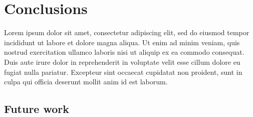 

\chapter{Conclusions} \label{cha:concl}



\drop Lorem ipsum dolor sit amet, consectetur adipiscing elit, sed do eiusmod
tempor incididunt ut labore et dolore magna aliqua. Ut enim ad minim veniam,
quis nostrud exercitation ullamco laboris nisi ut aliquip ex ea commodo
consequat. Duis aute irure dolor in reprehenderit in voluptate velit esse
cillum dolore eu fugiat nulla pariatur. Excepteur sint occaecat cupidatat non
proident, sunt in culpa qui officia deserunt mollit anim id est laborum.



\section{Future work}

